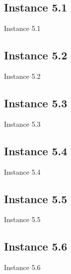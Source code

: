 \subsection{Instance 5.1}
\begin{table}[H]
\centering

\caption{Instance 5.1}
\label{tblscp51}
\end{table}
\newpage

\subsection{Instance 5.2}
\begin{table}[H]
\centering

\caption{Instance 5.2}
\label{tblscp52}
\end{table}
\newpage

\subsection{Instance 5.3}
\begin{table}[H]
\centering

\caption{Instance 5.3}
\label{tblscp53}
\end{table}
\newpage

\subsection{Instance 5.4}
\begin{table}[H]
\centering

\caption{Instance 5.4}
\label{tblscp54}
\end{table}
\newpage

\subsection{Instance 5.5}
\begin{table}[H]
\centering

\caption{Instance 5.5}
\label{tblscp55}
\end{table}
\newpage

\subsection{Instance 5.6}
\begin{table}[H]
\centering

\caption{Instance 5.6}
\label{tblscp56}
\end{table}
\newpage


